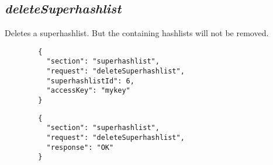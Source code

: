 \subsection*{\textit{deleteSuperhashlist}}
	Deletes a superhashlist. But the containing hashlists will not be removed.
	{
		\color{blue}
		\begin{verbatim}
		{
		  "section": "superhashlist",
		  "request": "deleteSuperhashlist",
		  "superhashlistId": 6,
		  "accessKey": "mykey"
		}
		\end{verbatim}
	}
	{
		\color{OliveGreen}
		\begin{verbatim}
		{
		  "section": "superhashlist",
		  "request": "deleteSuperhashlist",
		  "response": "OK"
		}
		\end{verbatim}
	}







